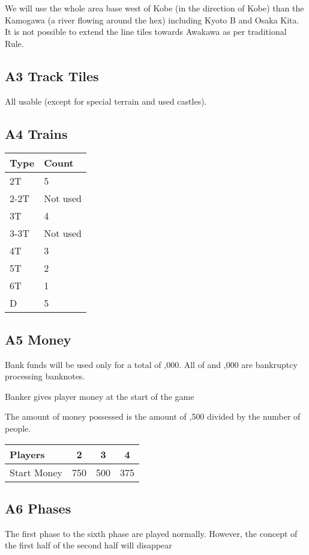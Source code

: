 \documentclass{article}
\begin{document}
\begin{CJK}{UTF8}{min}
We will use the whole area base west of Kobe (in the direction of
Kobe) than the Kamogawa (a river flowing around the hex) including
Kyoto B and Osaka Kita. It is not possible to extend the line tiles
towards Awakawa as per traditional Rule.

\subsection*{A3 Track Tiles}

All usable (except for special terrain and used castles).

\subsection*{A4 Trains}
\begin{tabular}{ll}
Type & Count \\
\hline
2T & 5\\
2-2T & Not used\\
3T & 4 \\
3-3T & Not used \\
4T & 3 \\
5T & 2 \\
6T & 1 \\
D & 5
\end{tabular}

\subsection*{A5 Money}

Bank funds will be used only for a total of ,000. All of
 and ,000 are bankruptcy processing banknotes.

Banker gives player money at the start of the game

The amount of money possessed is the amount of
,500 divided by the number of people.

\begin{tabular}{|l|c|c|c|}
\hline
Players & 2 & 3 & 4 \\
\hline
Start Money & 750 & 500 & 375 \\
\hline
\end{tabular}

\subsection*{A6 Phases}

The first phase to the sixth phase are played normally. However, the
concept of the first half of the second half will disappear


\end{CJK}
\end{document}
